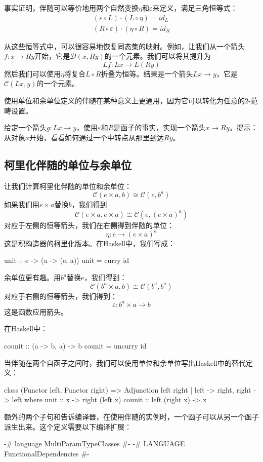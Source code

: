 \documentclass[DaoFP]{subfiles}
\begin{document}
事实证明，伴随可以等价地用两个自然变换$\eta$和$\varepsilon$来定义，满足三角恒等式：
\begin{align*}
(\varepsilon \circ L) \cdot (L \circ \eta) = id_L \\
(R \circ \varepsilon) \cdot (\eta \circ R) = id_R
\end{align*}

从这些恒等式中，可以很容易地恢复同态集的映射。例如，让我们从一个箭头$f \colon x \to R y$开始，它是$\mathcal{D}( x , R y)$的一个元素。我们可以将其提升为
\[L f \colon L x \to L (R y)\]
然后我们可以使用$\eta$将复合$L \circ R$折叠为恒等。结果是一个箭头$L x \to y$，它是$ \mathcal{C} (L x, y)$的一个元素。

使用单位和余单位定义的伴随在某种意义上更通用，因为它可以转化为任意的$2$-范畴设置。

\begin{exercise}
给定一个箭头$g \colon L x \to y$，使用$\varepsilon$和$R$是函子的事实，实现一个箭头$x \to R y$。提示：从对象$x$开始，看看如何通过一个中转点从那里到达$R y$。
\end{exercise}

\subsection{柯里化伴随的单位与余单位}

让我们计算柯里化伴随的单位和余单位：
\[  \mathcal{C}(e \times a, b ) \cong  \mathcal{C} (e, b^a)  \]
如果我们用$e \times a$替换$b$，我们得到
\[  \mathcal{C}(e \times a, e \times a ) \cong  \mathcal{C} (e, (e \times a)^a)  \]
对应于左侧的恒等箭头，我们在右侧得到伴随的单位：
\[ \eta \colon e \to (e \times a)^a \]
这是积构造器的柯里化版本。在Haskell中，我们写成：
\begin{haskell}
unit :: e -> (a -> (e, a))
unit = curry id
\end{haskell}

余单位更有趣。用$b^a$替换$e$，我们得到：
\[  \mathcal{C}(b^a \times a, b ) \cong  \mathcal{C} (b^a, b^a)  \]
对应于右侧的恒等箭头，我们得到：
\[ \varepsilon \colon b^a \times a \to b \]
这是函数应用箭头。

在Haskell中：
\begin{haskell}
counit :: (a -> b, a) -> b
counit = uncurry id
\end{haskell}

当伴随在两个自函子之间时，我们可以使用单位和余单位写出Haskell中的替代定义：
\begin{haskell}
class (Functor left, Functor right) => 
  Adjunction left right | left -> right, right -> left where
    unit   :: x -> right (left x)
    counit :: left (right x) -> x
\end{haskell}
额外的两个子句和告诉编译器，在使用伴随的实例时，一个函子可以从另一个函子派生出来。这个定义需要以下编译扩展：
\begin{haskell}
{-# language MultiParamTypeClasses #-}
{-# LANGUAGE FunctionalDependencies #-}
\end{haskell}
\end{document}
